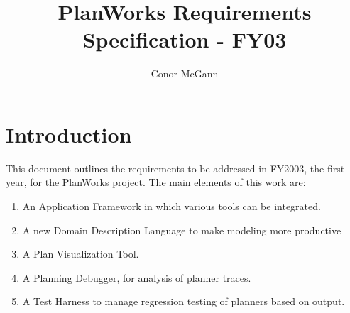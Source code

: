 \documentclass[twoside, 11pt]{article}
\author{Conor McGann}
\title{PlanWorks Requirements Specification - FY03}
\begin{document}
\maketitle

\section{Introduction}
This document outlines the requirements to be addressed in FY2003, the first year, for the PlanWorks project. The main elements of this work are:
\begin{enumerate}
\item An Application Framework in which various tools can be integrated.
\item A new Domain Description Language to make modeling more productive
\item A Plan Visualization Tool.
\item A Planning Debugger, for analysis of planner traces.
\item A Test Harness to manage regression testing of planners based on output.
\end{enumerate}
\end{document}
